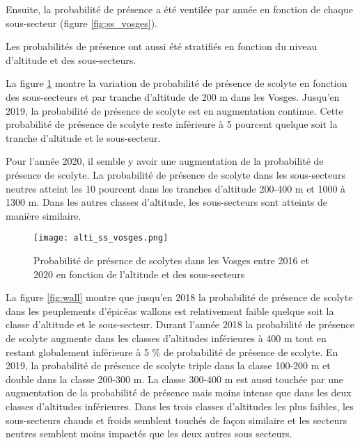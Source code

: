 Ensuite, la probabilité de présence a été ventilée par année en fonction de chaque sous-secteur (figure \ref{fig:ss_vosges}). 


Les probabilités de présence ont aussi été stratifiés en fonction du niveau d'altitude et des sous-secteurs.

La figure \ref{fig:vosge} montre la variation de probabilité de présence de scolyte en fonction des sous-secteurs et par tranche d'altitude de 200 m dans les Vosges. Jusqu'en 2019, la probabilité de présence de scolyte est en augmentation continue.
Cette probabilité de présence de scolyte reste inférieure à 5 pourcent quelque soit la tranche d'altitude et le sous-secteur.

Pour l'année 2020, il semble y avoir une augmentation de la probabilité de présence de scolyte. La probabilité de présence de scolyte dans les sous-secteurs neutres atteint les 10 pourcent dans les tranches d'altitude 200-400 m et 1000 à 1300 m. Dans les autres classes d'altitude, les sous-secteurs sont atteints de manière similaire.









\begin{figure} [htbp] 
	\centering
	\texttt{[image: alti\_ss\_vosges.png]}
	\caption{Probabilité de présence de scolytes dans les Vosges entre 2016 et 2020 en fonction de l'altitude et des sous-secteurs}
	\label{fig:vosge}
\end{figure}

La figure \ref{fig:wall} montre que jusqu'en 2018 la probabilité de présence de scolyte dans les peuplements d'épicéas wallons est relativement faible quelque soit la classe d'altitude et le sous-secteur. Durant l'année 2018 la probabilité de présence de scolyte augmente dans les classes d'altitudes inférieures à 400 m tout en restant globalement inférieure à 5 \% de probabilité de présence de scolyte.
En 2019, la probabilité de présence de scolyte triple  dans la classe 100-200 m et double dans la classe 200-300 m. La classe 300-400 m est aussi touchée par une augmentation de la probabilité de présence mais moins intense que dans les deux classes d'altitudes inférieures. Dans les trois classes d'altitudes les plus faibles, les sous-secteurs chauds et froids semblent touchés de façon similaire et les secteurs neutres semblent moins impactés que les deux autres sous secteurs. \\

